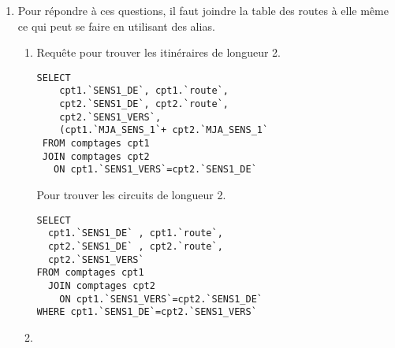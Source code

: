 \begin{enumerate}
\item Pour répondre à ces questions, il faut joindre la table des routes à elle même ce qui peut se faire en utilisant des alias. 
\begin{enumerate}
  \item Requête pour trouver les itinéraires de longueur 2.
\begin{verbatim}
SELECT 
    cpt1.`SENS1_DE`, cpt1.`route`,
    cpt2.`SENS1_DE`, cpt2.`route`,
    cpt2.`SENS1_VERS`,
    (cpt1.`MJA_SENS_1`+ cpt2.`MJA_SENS_1`
 FROM comptages cpt1 
 JOIN comptages cpt2 
   ON cpt1.`SENS1_VERS`=cpt2.`SENS1_DE`
\end{verbatim}
Pour trouver les circuits de longueur 2.
\begin{verbatim}
SELECT 
  cpt1.`SENS1_DE` , cpt1.`route`,
  cpt2.`SENS1_DE` , cpt2.`route`,
  cpt2.`SENS1_VERS` 
FROM comptages cpt1 
  JOIN comptages cpt2 
    ON cpt1.`SENS1_VERS`=cpt2.`SENS1_DE` 
WHERE cpt1.`SENS1_DE`=cpt2.`SENS1_VERS`  
\end{verbatim}

  \item 
\end{enumerate}

\end{enumerate}
